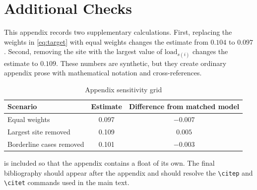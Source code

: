 \appendix

\section{Additional Checks}
\label{app:checks}

This appendix records two supplementary calculations. First, replacing the weights in \cref{eq:target} with equal weights changes the estimate from $0.104$ to $0.097$. Second, removing the site with the largest value of $\mathrm{load}_{s(i)}$ changes the estimate to $0.109$. These numbers are synthetic, but they create ordinary appendix prose with mathematical notation and cross-references.

\begin{table}[tbp]
\centering
\caption{Appendix sensitivity grid}
\label{tab:appendix-grid}
\begin{tabular}{@{}lcc@{}}
\toprule
Scenario & Estimate & Difference from matched model \\
\midrule
Equal weights & 0.097 & $-0.007$ \\
Largest site removed & 0.109 & $0.005$ \\
Borderline cases removed & 0.101 & $-0.003$ \\
\bottomrule
\end{tabular}
\end{table}

 is included so that the appendix contains a float of its own. The final bibliography should appear after the appendix and should resolve the \texttt{\textbackslash citep} and \texttt{\textbackslash citet} commands used in the main text.





